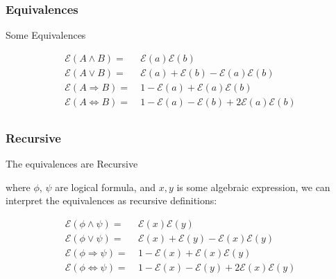 \documentclass{beamer}
\begin{document}
\begin{frame}
\frametitle{Equivalences}
\begin{block}
{Some Equivalences}

\begin{equation}
\begin{aligned}
\mathcal{E} (A \land B) =&\ \mathcal{E}(a)\mathcal{E}(b)\\
\mathcal{E} (A \lor B) =&\ \mathcal{E}(a) + \mathcal{E}(b) - \mathcal{E}(a)\mathcal{E}(b)\\
\mathcal{E} (A \Rightarrow B) =&\ 1 - \mathcal{E}(a) + \mathcal{E}(a)\mathcal{E}(b)\\
\mathcal{E} (A \Leftrightarrow B) =&\ 1 - \mathcal{E}(a) - \mathcal{E}(b) + 2\mathcal{E}(a)\mathcal{E}(b)\\
\end{aligned}
\end{equation}

\end{block}
\end{frame}

\begin{frame}
\frametitle{Recursive}
\begin{block}
{The equivalences are Recursive}

where \(\phi\), \(\psi\) are logical formula, and \(x,y\) is some algebraic expression, we can interpret the equivalences as recursive definitions:

\begin{equation}
\begin{aligned}
\mathcal{E} (\phi \land \psi) =&\ \mathcal{E}(x)\mathcal{E}(y)\\
\mathcal{E} (\phi \lor \psi) =&\ \mathcal{E}(x) + \mathcal{E}(y) - \mathcal{E}(x)\mathcal{E}(y)\\
\mathcal{E} (\phi \Rightarrow \psi) =&\ 1 - \mathcal{E}(x) + \mathcal{E}(x)\mathcal{E}(y)\\
\mathcal{E} (\phi \Leftrightarrow \psi) =&\ 1 - \mathcal{E}(x) - \mathcal{E}(y) + 2\mathcal{E}(x)\mathcal{E}(y)\\
\end{aligned}
\end{equation}

\end{block}
\end{frame}
\end{document}
